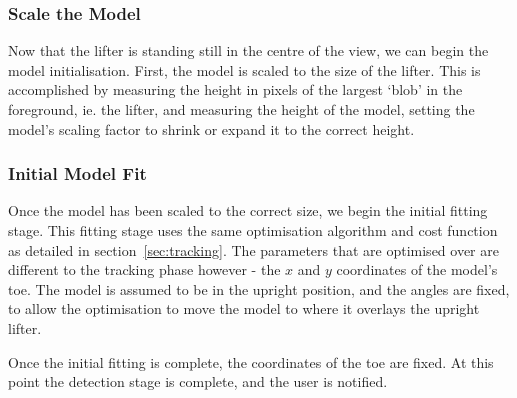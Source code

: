 \subsubsection{Scale the Model}
Now that the lifter is standing still in the centre of the view, we can begin the model initialisation. First, the model is scaled to the size of the lifter. This is accomplished by measuring the height in pixels of the largest `blob' in the foreground, ie. the lifter, and measuring the height of the model, setting the model's scaling factor to shrink or expand it to the correct height.

\subsubsection{Initial Model Fit}
Once the model has been scaled to the correct size, we begin the initial fitting stage. This fitting stage uses the same optimisation algorithm and cost function as detailed in section~\ref{sec:tracking}. The parameters that are optimised over are different to the tracking phase however - the $x$ and $y$ coordinates of the model's toe. The model is assumed to be in the upright position, and the angles are fixed, to allow the optimisation to move the model to where it overlays the upright lifter.

Once the initial fitting is complete, the coordinates of the toe are fixed. At this point the detection stage is complete, and the user is notified.